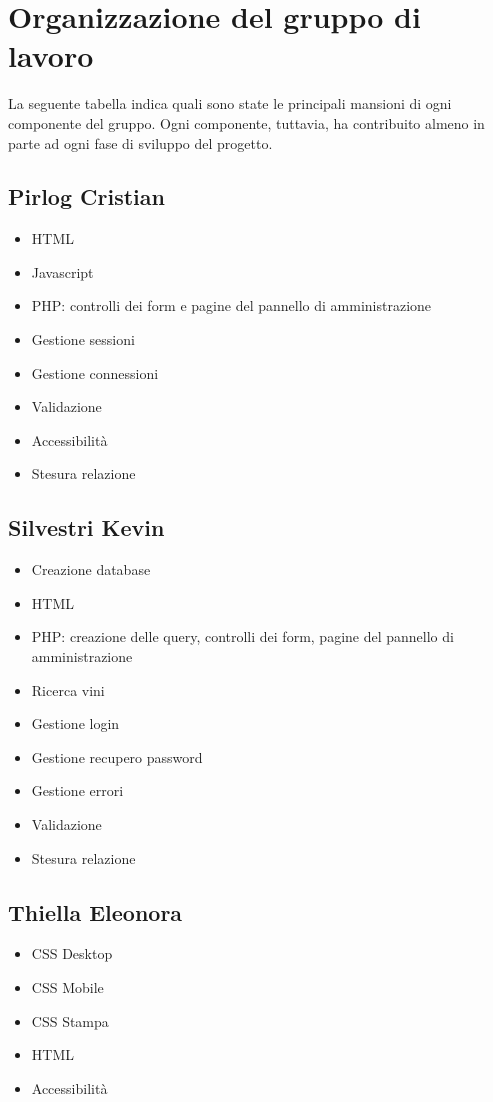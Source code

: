 \section{Organizzazione del gruppo di lavoro}

La seguente tabella indica quali sono state le principali mansioni di ogni componente del gruppo. Ogni componente, tuttavia, ha contribuito almeno in parte ad ogni fase di sviluppo del progetto.

\subsection{Pirlog Cristian}

\begin{itemize}
	\item HTML
	\item Javascript
	\item PHP: controlli dei form e pagine del pannello di amministrazione
	\item Gestione sessioni
	\item Gestione connessioni
	\item Validazione
	\item Accessibilità
	\item Stesura relazione
\end{itemize}

\subsection{Silvestri Kevin}

\begin{itemize}
	\item Creazione database
	\item HTML
	\item PHP: creazione delle query, controlli dei form, pagine del pannello di amministrazione
	\item Ricerca vini
	\item Gestione login
	\item Gestione recupero password
	\item Gestione errori
	\item Validazione
	\item Stesura relazione
\end{itemize}

\subsection{Thiella Eleonora}

\begin{itemize}
	\item CSS Desktop
	\item CSS Mobile
	\item CSS Stampa
	\item HTML
	\item Accessibilità
\end{itemize}

